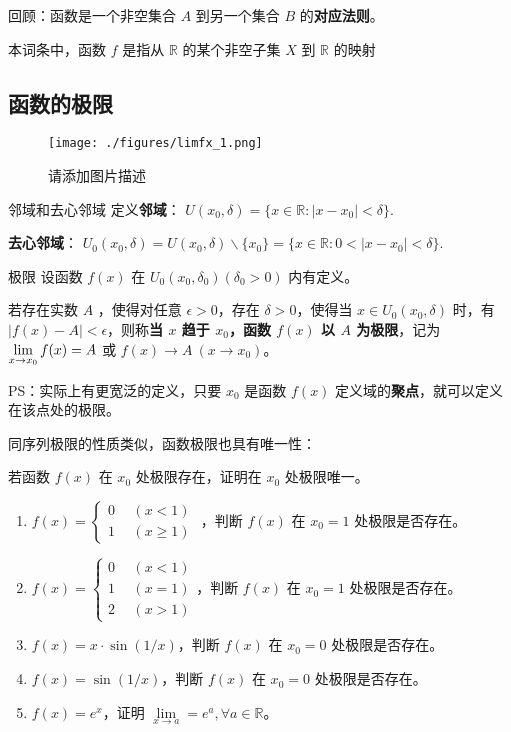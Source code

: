 

回顾：函数是一个非空集合 $A$ 到另一个集合 $B$ 的\textbf{对应法则}。

本词条中，函数 $f$ 是指从 $\mathbb R$ 的某个非空子集 $X$ 到 $\mathbb{R}$ 的映射  

\subsection{函数的极限}
\begin{figure}[ht]
\centering
\texttt{[image: ./figures/limfx\_1.png]}
\caption{请添加图片描述} \label{limfx_fig1}
\end{figure}
\begin{definition}{邻域和去心邻域}
  定义\textbf{邻域}： $U(x_0,\delta)=\{x\in \mathbb{R}:|x-x_0|<\delta\}$.

  \textbf{去心邻域}： $U_0(x_0,\delta)= U(x_0,\delta) \backslash \{x_0\}=\{x\in \mathbb{R}:0<|x-x_0|<\delta\}$.
\end{definition}
\begin{definition}{极限}
 设函数 $f(x)$ 在 $U_0(x_0,\delta_0)(\delta_0>0)$ 内有定义。

  若存在实数 $A$ ，使得对任意 $\epsilon >0$，存在 $\delta>0$，使得当 $x\in U_0(x_0,\delta)$ 时，有 $|f(x)-A|<\epsilon$，则称\textbf{当 $x$ 趋于 $x_0$，函数 $f(x)$ 以 $A$ 为极限}，记为 $\large \lim\limits_{x\rightarrow x_0}f(x)=A$ 或 $f(x)\rightarrow A\ (x\rightarrow x_0)$。
\end{definition}
PS：实际上有更宽泛的定义，只要 $x_0$ 是函数 $f(x)$ 定义域的\textbf{聚点}，就可以定义在该点处的极限。

同序列极限的性质类似，函数极限也具有唯一性：
\begin{theorem}{}
  若函数 $f(x)$ 在 $x_0$ 处极限存在，证明在 $x_0$ 处极限唯一。
\end{theorem}
\begin{exercise}{}
\begin{enumerate}
\item  $f(x)=\left\{\begin{aligned} 0\ \ &(x<1)\\ 1\ \ &(x\ge 1) \end{aligned}\right.$ ，判断 $f(x)$ 在 $x_0=1$ 处极限是否存在。
\item $f(x)=\left\{\begin{aligned} 0\ \ &(x<1)\\ 1\ \ &(x= 1)\\2\ \ &(x>1) \end{aligned}\right.$，判断 $f(x)$ 在 $x_0=1$ 处极限是否存在。
\item $f(x)=x\cdot \sin(1/x)$，判断 $f(x)$ 在 $x_0=0$ 处极限是否存在。
\item $f(x)=\sin(1/x)$，判断 $f(x)$ 在 $x_0=0$ 处极限是否存在。
\item $f(x)=e^x$，证明 $\lim\limits_{x\rightarrow a}=e^a,\forall a\in\mathbb{R}$。
\end{enumerate}
\end{exercise}

